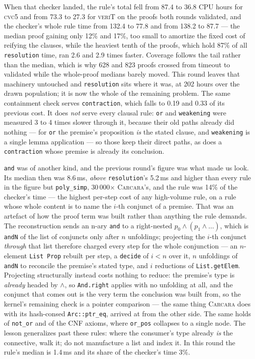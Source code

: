\documentclass[runningheads]{llncs}
\newcommand{\cvcv}{\textsc{cvc5}\xspace}
\newcommand{\carcara}{\textsc{Carcara}\xspace}
\newcommand{\verit}{\textsc{veriT}\xspace}
\newcommand{\rulename}[1]{\texttt{#1}}
\begin{document}
When that checker landed, the rule's total fell from 87.4 to 36.8 CPU hours for
\cvcv and from 73.3 to 27.3 for \verit on the proofs both rounds validated, and
the checker's whole rule time from 132.4 to 77.8 and from 138.2 to 87.7 --- the
median proof gaining only 12\% and 17\%, too small to amortize the fixed cost of
reifying the clauses, while the heaviest tenth of the proofs, which hold 87\% of
all \rulename{resolution} time, ran 2.6 and 2.9 times faster. Coverage follows
the tail rather than the median, which is why 628 and 823 proofs crossed from
timeout to validated while the whole-proof medians barely moved. This round
leaves that machinery untouched and \rulename{resolution} sits where it was, at
202 hours over the drawn population; it is now the whole of the remaining
problem. The same containment check
serves \rulename{contraction}, which falls to 0.19 and 0.33 of its previous
cost. It does \emph{not} serve every clausal rule: \rulename{or} and
\rulename{weakening} were measured 3 to 4 times slower through it, because
their old paths already did nothing --- for \rulename{or} the premise's
proposition \emph{is} the stated clause, and \rulename{weakening} is a single
lemma application --- so those keep their direct paths, as does a
\rulename{contraction} whose premise is already its conclusion.

\rulename{and} was of another kind, and the previous round's figure was what
made us look. Its median then was 8.6\,ms, \emph{above} \rulename{resolution}'s
5.2\,ms and higher than every rule in the figure but \rulename{poly\_simp},
30\,000$\times$ \carcara's, and the rule was 14\% of the checker's time --- the
highest per-step cost of any high-volume rule, on a rule whose whole content is
to name the $i$-th conjunct of a premise. That was an artefact of how the proof
term was built rather than anything the rule demands. The reconstruction sends an n-ary
\lstinline{and} to a right-nested $p_0 \wedge (p_1 \wedge \ldots)$, which is
\lstinline{andN} of the list of conjuncts only after $n$ unfoldings; projecting
the $i$-th conjunct \emph{through} that list therefore charged every step for
the whole conjunction --- an $n$-element \lstinline{List Prop} rebuilt per step,
a \lstinline{decide} of $i < n$ over it, $n$ unfoldings of \lstinline{andN} to
reconcile the premise's stated type, and $i$ reductions of
\lstinline{List.getElem}. Projecting structurally instead costs nothing to
reduce: the premise's type is \emph{already} headed by $\wedge$, so
\lstinline{And.right} applies with no unfolding at all, and the conjunct that
comes out is the very term the conclusion was built from, so the kernel's
remaining check is a pointer comparison --- the same thing \carcara does with
its hash-consed \lstinline{Arc::ptr_eq}, arrived at from the other side. The
same holds of \rulename{not\_or} and of the CNF axioms, where
\rulename{or\_pos} collapses to a single node. The lesson generalizes past
these rules: where the consumer's type already \emph{is} the connective, walk
it; do not manufacture a list and index it. In this round the rule's median is
1.4\,ms and its share of the checker's time 3\%.
\end{document}
